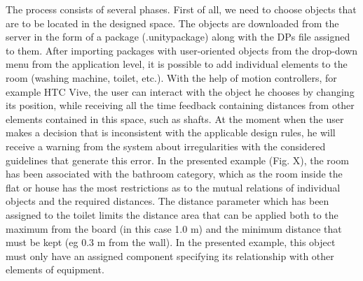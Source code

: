 \documentclass[runningheads]{llncs}
\begin{document}
The process consists of several phases. First of all, we need to choose objects that are to be located in the designed space. The objects are downloaded from the server in the form of a package (.unitypackage) along with the DPs file assigned to them. After importing packages with user-oriented objects from the drop-down menu from the application level, it is possible to add individual elements to the room (washing machine, toilet, etc.). With the help of motion controllers, for example HTC Vive, the user can interact with the object he chooses by changing its position, while receiving all the time feedback containing distances from other elements contained in this space, such as shafts.
At the moment when the user makes a decision that is inconsistent with the applicable design rules, he will receive a warning from the system about irregularities with the considered guidelines that generate this error.
In the presented example (Fig. X), the room has been associated with the bathroom category, which as the room inside the flat or house has the most restrictions as to the mutual relations of individual objects and the required distances. The distance parameter which has been assigned to the toilet limits the distance area that can be applied both to the maximum from the board (in this case 1.0 m) and the minimum distance that must be kept (eg 0.3 m from the wall). In the presented example, this object must only have an assigned component specifying its relationship with other elements of equipment.
\end{document}
